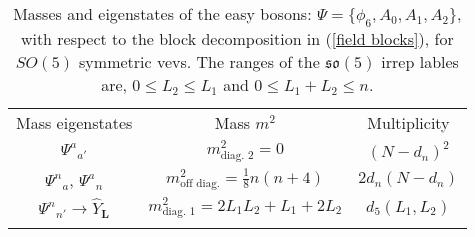 %
%
\begin{table}
%
\begin{center}
%
\begingroup
\setlength{\tabcolsep}{10pt} %
\renewcommand{\arraystretch}{2.0} %
%
\begin{tabular}{ !{\vrule width 1.5pt}c!{\vrule width 1.5pt}c!{\vrule width 1.5pt}c!{\vrule width 1.5pt} }
 	Mass eigenstates & Mass $m^2$ & Multiplicity \\
 	${\Psi^a}_{a'}$ & $m^2_{\text{diag. 2}} = 0$ & $(N-d_n)^2$ \\
 	\hline
 	${\Psi^n}_{a}$, ${\Psi^a}_{n}$ & $m^2_{\text{off diag.}} = \frac{1}{8} n (n + 4)$ & $2 d_n (N-d_n)$ \\
 	\hline
 	${\Psi^n}_{n'} \to \hat{Y}_{\mathbf{L}}$ & $m^2_{\text{diag. 1}} = 2 L_1 L_2 + L_1 + 2 L_2$ & $d_5(L_1, L_2)$ \\
\end{tabular}
%
\endgroup
%
\end{center}
%
\caption[Masses and eigenstates for $SO(5)$ easy bosons]{Masses and eigenstates of the easy bosons: $\Psi = \{ \phi_6, A_0, A_1, A_2 \}$, with respect to the block decomposition in (\ref{field blocks}), for $SO(5)$ symmetric vevs. The ranges of the $\mathfrak{so}(5)$ irrep lables are, $0 \leq L_2 \leq L_1$ and $0 \leq L_1 + L_2 \leq n$.}
%
\label{tab:boson_masses_easy_so(5)}
%
\end{table}
%
%

